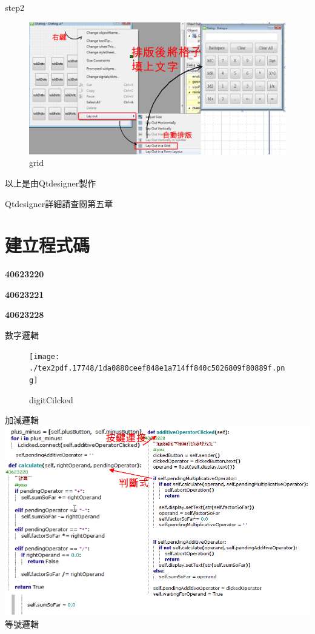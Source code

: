 \documentclass[12pt,,]{report}
\begin{document}
step2

\begin{figure}
\centering
\includegraphics{./tex2pdf.17748/5adf72ef7cc9374dcc293eda6ce7834a69361a58.png}
\caption{grid\label{fig:排版}}
\end{figure}

以上是由Qtdesigner製作

Qtdesigner詳細請查閱第五章

\hypertarget{ux5efaux7acbux7a0bux5f0fux78bc}{%
\section{建立程式碼}\label{ux5efaux7acbux7a0bux5f0fux78bc}}

\textbf{40623220}

\textbf{40623221}

\textbf{40623228}

數字邏輯

\begin{figure}
\centering
\texttt{[image: ./tex2pdf.17748/1da0880ceef848e1a714ff840c5026809f80889f.png]}
\caption{digitCilcked\label{fig:digitCilcked}}
\end{figure}

加減邏輯
\includegraphics{./tex2pdf.17748/e1435c963e5def4df9b9df0059886bf63ffed823.png}
等號邏輯
\end{document}
